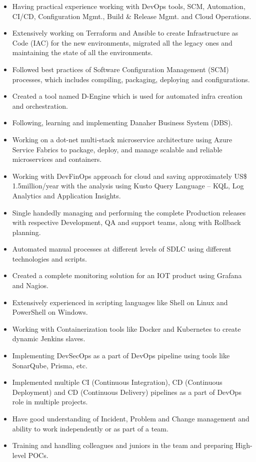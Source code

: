 \documentclass[11pt, a4paper]{article}
\begin{document}
\begin{itemize}[noitemsep, nolistsep,leftmargin=5mm,rightmargin=2mm]
\item Having practical experience working with DevOps tools, SCM, Automation, CI/CD, Configuration Mgmt., Build \& Release Mgmt. and Cloud Operations.
\item Extensively working on Terraform and Ansible to create Infrastructure as Code (IAC) for the new environments, migrated all the legacy ones and maintaining the state of all the environments.
\item Followed best practices of Software Configuration Management (SCM) processes, which includes compiling, packaging, deploying and configurations.
\item Created a tool named D-Engine which is used for automated infra creation and orchestration.
\item Following, learning and implementing Danaher Business System (DBS).
\item Working on a dot-net multi-stack microservice architecture using Azure Service Fabrics to package, deploy, and manage scalable and reliable microservices and containers.
\item Working with DevFinOps approach for cloud and saving  approximately US\$ 1.5million/year with the analysis using Kusto Query Language – KQL, Log Analytics and Application Insights.
\item Single handedly managing and performing the complete Production releases with respective Development, QA and support teams, along with Rollback planning.
\item Automated manual processes at different levels of SDLC using different technologies and scripts.
\item Created a complete monitoring solution for an IOT product using Grafana and Nagios.
\item Extensively experienced in scripting languages like Shell on Linux and PowerShell on Windows.
\item Working with Containerization tools like Docker and Kubernetes to create dynamic Jenkins slaves.
\item Implementing DevSecOps as a part of DevOps pipeline using tools like SonarQube, Prisma, etc.
\item Implemented multiple CI (Continuous Integration), CD (Continuous Deployment) and CD (Continuous Delivery) pipelines as a part of DevOps role in multiple projects.
\item Have good understanding of Incident, Problem and Change management and ability to work independently or as part of a team.
\item Training and handling colleagues and juniors in the team and preparing High-level POCs.
\end{itemize}
\end{document}
